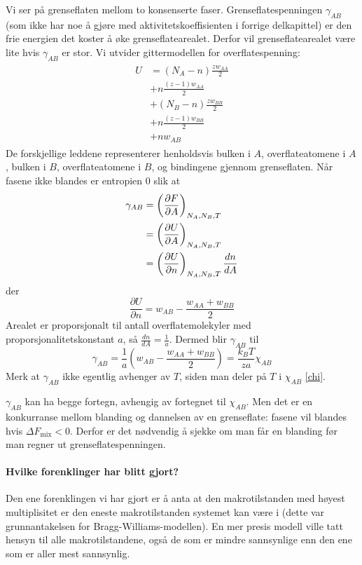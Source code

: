 Vi ser på grenseflaten mellom to konsenserte faser. Grenseflatespenningen $\gamma_{AB}$ (som ikke har noe å gjøre med aktivitetskoeffisienten i forrige delkapittel) er den frie energien det koster å øke grenseflatearealet. Derfor vil grenseflatearealet være lite hvis $\gamma_{AB}$ er stor. Vi utvider gittermodellen for overflatespenning:
\begin{align}
\begin{split}
	U&=(N_A-n)\frac{zw_{AA}}{2}\\&+n\frac{(z-1)w_{AA}}{2}\\&+(N_B-n)\frac{zw_{BB}}{2}\\&+n\frac{(z-1)w_{BB}}{2}\\&+nw_{AB}
\end{split}
\end{align}
De forskjellige leddene representerer henholdsvis bulken i $A$, overflateatomene i $A$, bulken i $B$, overflateatomene i $B$, og bindingene gjennom grenseflaten.
Når fasene ikke blandes er entropien 0 slik at
\begin{align}
\begin{split}
	\gamma_{AB}&=\left(\frac{\partial F}{\partial A}\right)_{N_A,N_B,T}\\&=\left(\frac{\partial U}{\partial A}\right)_{N_A,N_B,T}\\&=\left(\frac{\partial U}{\partial n}\right)_{N_A,N_B,T}\frac{dn}{dA}
\end{split}
\end{align}
der 
\begin{equation}
	\frac{\partial U}{\partial n} = w_{AB} - \frac{w_{AA}+w_{BB}}{2}
\end{equation}
Arealet er proporsjonalt til antall overflatemolekyler med proporsjonalitetskonstant $a$, så $\frac{dn}{dA}=\frac{1}{a}$. Dermed blir $\gamma_{AB}$ til
\begin{equation}
	\gamma_{AB} = \frac{1}{a}\left(w_{AB}-\frac{w_{AA}+w_{BB}}{2}\right)=\frac{k_BT}{za}\chi_{AB}
\end{equation}
Merk at $\gamma_{AB}$ ikke egentlig avhenger av $T$, siden man deler på $T$ i $\chi_{AB}$ \eqref{chi}. 

$\gamma_{AB}$ kan ha begge fortegn, avhengig av fortegnet til $\chi_{AB}$. Men det er en konkurranse mellom blanding og dannelsen av en grenseflate: fasene vil blandes hvis $\Delta F_{\text{mix}}<0$. Derfor er det nødvendig å sjekke om man får en blanding før man regner ut grenseflatespenningen.

\paragraph{Hvilke forenklinger har blitt gjort?}
Den ene forenklingen vi har gjort er å anta at den makrotilstanden med høyest multiplisitet er den eneste makrotilstanden systemet kan være i (dette var grunnantakelsen for Bragg-Williams-modellen). En mer presis modell ville tatt hensyn til alle makrotilstandene, også de som er mindre sannsynlige enn den ene som er aller mest sannsynlig.

